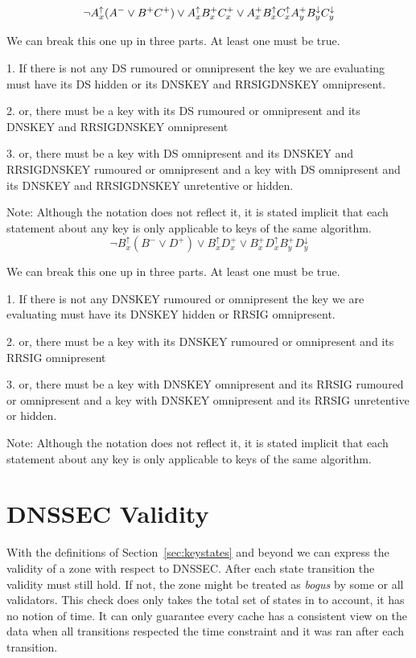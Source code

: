 \documentclass[twoside, a4paper]{article}
\begin{document}
\begin{equation}
\neg A_{x}^{\uparrow} (A^{-} \vee B^{+} C^{+}) \vee A_{x}^{\uparrow}
	B_{x}^{+} C_{x}^{+} \vee A_{x}^{+} B_{x}^{\uparrow} C_{x}^{\uparrow}
	A_{y}^{+} B_{y}^{\downarrow} C_{y}^{\downarrow}\\
\end{equation}

We can break this one up in three parts. At least one must be true.

1. If there is not any DS rumoured or omnipresent the key we are evaluating
must have its DS hidden or its DNSKEY and RRSIGDNSKEY omnipresent.

2. or, there must be a key with its DS rumoured or omnipresent and 
its DNSKEY and RRSIGDNSKEY omnipresent

3. or, there must be a key with DS omnipresent and its DNSKEY and RRSIGDNSKEY rumoured or omnipresent
and a key with DS omnipresent and its DNSKEY and RRSIGDNSKEY unretentive or hidden.

Note: Although the notation does not reflect it, it is stated implicit
that each statement about any key is only applicable to keys of the same algorithm.
\begin{equation}
\neg B_{x}^{\uparrow} (B^{-} \vee D^{+}) \vee 
	B_{x}^{\uparrow} D_{x}^{+} \vee 
	B_{x}^{+} D_{x}^{\uparrow} B_{y}^{+} D_{y}^{\downarrow}
\end{equation}

We can break this one up in three parts. At least one must be true.

1. If there is not any DNSKEY rumoured or omnipresent the key we are evaluating
must have its DNSKEY hidden or RRSIG omnipresent.

2. or, there must be a key with its DNSKEY rumoured or omnipresent and 
its RRSIG omnipresent

3. or, there must be a key with DNSKEY omnipresent and its RRSIG rumoured or omnipresent
and a key with DNSKEY omnipresent and its RRSIG unretentive or hidden.

Note: Although the notation does not reflect it, it is stated implicit
that each statement about any key is only applicable to keys of the same algorithm.


\section{DNSSEC Validity} \label{validity}

With the definitions of Section~\ref{sec:keystates} and beyond we can
express the validity of a zone with respect to DNSSEC. After each state
transition the validity must still hold. If not, the zone might be treated as
\emph{bogus} by some or all validators. This check does only takes the 
total set of states in to account, it has no notion of time. It can
only guarantee every cache has a consistent view on the data when all
transitions respected the time constraint and it was ran after each
transition.
\end{document}

